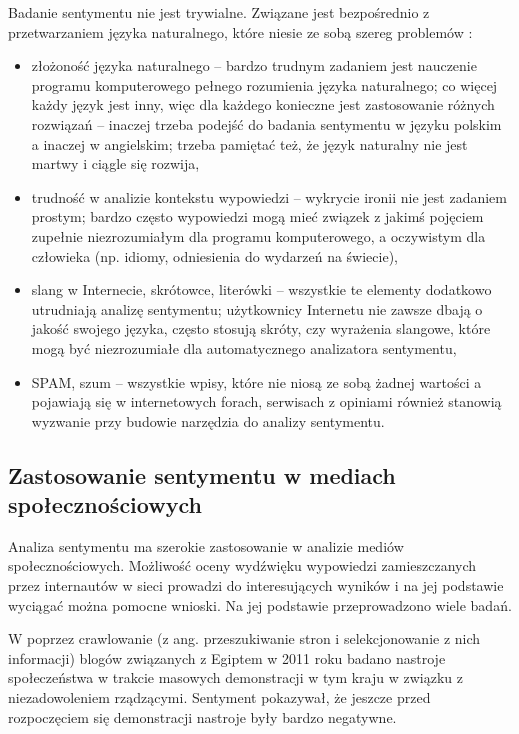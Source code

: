 Badanie sentymentu nie jest trywialne. Związane jest bezpośrednio z 
przetwarzaniem języka naturalnego, które niesie ze sobą szereg problemów
\cite{ChallengeOfSpokenLanguage, NaturalLanguageProcessingFuture}:

\begin{itemize}
  \item złożoność języka naturalnego -- bardzo trudnym zadaniem jest nauczenie 
  programu komputerowego pełnego rozumienia języka naturalnego; co więcej każdy
  język jest inny, więc dla każdego konieczne jest zastosowanie różnych
  rozwiązań -- inaczej trzeba podejść do badania sentymentu w języku polskim
  a inaczej w angielskim; trzeba pamiętać też, że język naturalny nie jest
  martwy i ciągle się rozwija,

  \item trudność w analizie kontekstu wypowiedzi -- wykrycie ironii nie jest
  zadaniem prostym; bardzo często wypowiedzi mogą mieć związek z jakimś pojęciem
  zupełnie niezrozumiałym dla programu komputerowego, a oczywistym dla człowieka
  (np. idiomy, odniesienia do wydarzeń na świecie),

  \item slang w Internecie, skrótowce, literówki -- wszystkie te elementy
  dodatkowo utrudniają analizę sentymentu; użytkownicy Internetu nie zawsze
  dbają o jakość swojego języka, często stosują skróty, czy wyrażenia slangowe,
  które mogą być niezrozumiałe dla automatycznego analizatora sentymentu,

  \item SPAM, szum -- wszystkie wpisy, które nie niosą ze sobą żadnej wartości
  a pojawiają się w internetowych forach, serwisach z opiniami również stanowią
  wyzwanie przy budowie narzędzia do analizy sentymentu.

\end{itemize}





\subsection{Zastosowanie sentymentu w mediach społecznościowych}
Analiza sentymentu ma szerokie zastosowanie w analizie mediów społecznościowych.
Możliwość oceny wydźwięku wypowiedzi zamieszczanych przez internautów w sieci
prowadzi do interesujących wyników i na jej podstawie wyciągać można pomocne
wnioski. Na jej podstawie przeprowadzono wiele badań. 

W \cite{AgileSentimentAnalysis}
poprzez crawlowanie (z ang. przeszukiwanie stron i selekcjonowanie z nich
informacji) blogów związanych z Egiptem w 2011 roku badano nastroje
społeczeństwa w trakcie masowych demonstracji w tym kraju w związku z
niezadowoleniem rządzącymi. Sentyment pokazywał, że jeszcze przed rozpoczęciem
się demonstracji nastroje były bardzo negatywne. 

